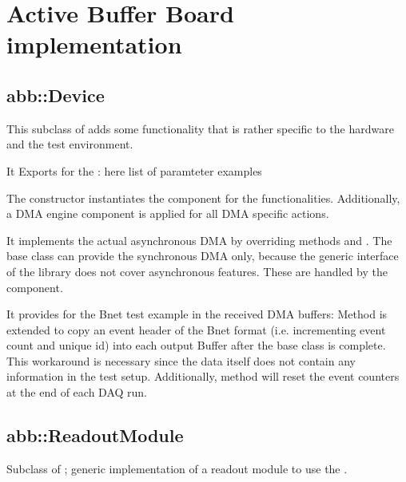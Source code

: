 \section{Active Buffer Board implementation}

\subsection{abb::Device}
This subclass of  adds some functionality that is
rather specific to the \ABB hardware and the test environment.


\begin{compactenum} 

\item It Exports  for the :
here list of paramteter examples

\item The constructor instantiates the  component for the
\ABB functionalities. Additionally, a DMA engine component
 is applied for all DMA specific actions.

\item It implements the actual asynchronous DMA by overriding 
methods  and .
The base class 
can provide the synchronous DMA only, because
the generic  interface of the 
library does not cover asynchronous features.
These are handled by the  component.

\item It provides   for the Bnet test example in the 
received DMA buffers: 
Method  is extended to copy an event header of the Bnet format (i.e. incrementing event count and unique id) into each output Buffer after the base class  is complete. This workaround is necessary since the \ABB
data itself does not contain any information in the test setup.
Additionally, method  will reset the event counters
at the end of each DAQ run. 


\end{compactenum} 

\subsection{abb::ReadoutModule}
Subclass of ; generic implementation of a readout module to use the .

